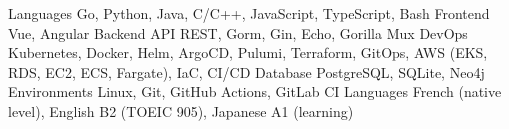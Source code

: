 \documentclass[11pt, a4paper]{awesome-cv}
\begin{document}
\makecvheader




\begin{cvskills}
  \cvskill
    {Languages}
    {Go, Python, Java, C/C++, JavaScript, TypeScript, Bash}
  \cvskill
    {Frontend}
    {Vue, Angular}
  \cvskill
    {Backend}
    {API REST, Gorm, Gin, Echo, Gorilla Mux}
  \cvskill
    {DevOps}
    {Kubernetes, Docker, Helm, ArgoCD, Pulumi, Terraform, GitOps, AWS (EKS, RDS, EC2, ECS, Fargate), IaC, CI/CD}
  \cvskill
    {Database}
    {PostgreSQL, SQLite, Neo4j}
  \cvskill
    {Environments}
    {Linux, Git, GitHub Actions, GitLab CI}
  \cvskill
    {Languages}
    {French (native level), English B2 (TOEIC 905), Japanese A1 (learning)}
\end{cvskills}

\end{document}
